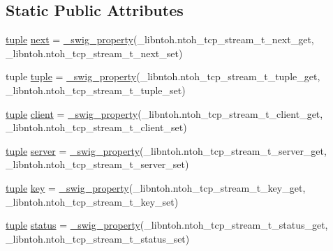 \subsection*{Static Public Attributes}
\begin{DoxyCompactItemize}
\item 
\hyperlink{classlibntoh_1_1ntoh__tcp__stream__t_a945ee80121c935cc2e86d758ecc70579}{tuple} \hyperlink{classlibntoh_1_1ntoh__tcp__stream__t_a84e6dac37062f5a539ece8248c8567cc}{next} = \hyperlink{namespacelibntoh_ae6f5626f776538e0cdb00e75ca1c96c9}{\-\_\-swig\-\_\-property}(\-\_\-libntoh.\-ntoh\-\_\-tcp\-\_\-stream\-\_\-t\-\_\-next\-\_\-get, \-\_\-libntoh.\-ntoh\-\_\-tcp\-\_\-stream\-\_\-t\-\_\-next\-\_\-set)
\item 
tuple \hyperlink{classlibntoh_1_1ntoh__tcp__stream__t_a945ee80121c935cc2e86d758ecc70579}{tuple} = \hyperlink{namespacelibntoh_ae6f5626f776538e0cdb00e75ca1c96c9}{\-\_\-swig\-\_\-property}(\-\_\-libntoh.\-ntoh\-\_\-tcp\-\_\-stream\-\_\-t\-\_\-tuple\-\_\-get, \-\_\-libntoh.\-ntoh\-\_\-tcp\-\_\-stream\-\_\-t\-\_\-tuple\-\_\-set)
\item 
\hyperlink{classlibntoh_1_1ntoh__tcp__stream__t_a945ee80121c935cc2e86d758ecc70579}{tuple} \hyperlink{classlibntoh_1_1ntoh__tcp__stream__t_aabcf5d3b98f85310bb8b763c3b935666}{client} = \hyperlink{namespacelibntoh_ae6f5626f776538e0cdb00e75ca1c96c9}{\-\_\-swig\-\_\-property}(\-\_\-libntoh.\-ntoh\-\_\-tcp\-\_\-stream\-\_\-t\-\_\-client\-\_\-get, \-\_\-libntoh.\-ntoh\-\_\-tcp\-\_\-stream\-\_\-t\-\_\-client\-\_\-set)
\item 
\hyperlink{classlibntoh_1_1ntoh__tcp__stream__t_a945ee80121c935cc2e86d758ecc70579}{tuple} \hyperlink{classlibntoh_1_1ntoh__tcp__stream__t_a3b90a824912f44140b739f0ddb0bbd84}{server} = \hyperlink{namespacelibntoh_ae6f5626f776538e0cdb00e75ca1c96c9}{\-\_\-swig\-\_\-property}(\-\_\-libntoh.\-ntoh\-\_\-tcp\-\_\-stream\-\_\-t\-\_\-server\-\_\-get, \-\_\-libntoh.\-ntoh\-\_\-tcp\-\_\-stream\-\_\-t\-\_\-server\-\_\-set)
\item 
\hyperlink{classlibntoh_1_1ntoh__tcp__stream__t_a945ee80121c935cc2e86d758ecc70579}{tuple} \hyperlink{classlibntoh_1_1ntoh__tcp__stream__t_a29eb8dd921f77e19e24a20bcd820c2ed}{key} = \hyperlink{namespacelibntoh_ae6f5626f776538e0cdb00e75ca1c96c9}{\-\_\-swig\-\_\-property}(\-\_\-libntoh.\-ntoh\-\_\-tcp\-\_\-stream\-\_\-t\-\_\-key\-\_\-get, \-\_\-libntoh.\-ntoh\-\_\-tcp\-\_\-stream\-\_\-t\-\_\-key\-\_\-set)
\item 
\hyperlink{classlibntoh_1_1ntoh__tcp__stream__t_a945ee80121c935cc2e86d758ecc70579}{tuple} \hyperlink{classlibntoh_1_1ntoh__tcp__stream__t_ad7843c85abee4764c9e717a8db8cb3a5}{status} = \hyperlink{namespacelibntoh_ae6f5626f776538e0cdb00e75ca1c96c9}{\-\_\-swig\-\_\-property}(\-\_\-libntoh.\-ntoh\-\_\-tcp\-\_\-stream\-\_\-t\-\_\-status\-\_\-get, \-\_\-libntoh.\-ntoh\-\_\-tcp\-\_\-stream\-\_\-t\-\_\-status\-\_\-set)

\end{DoxyCompactItemize}
